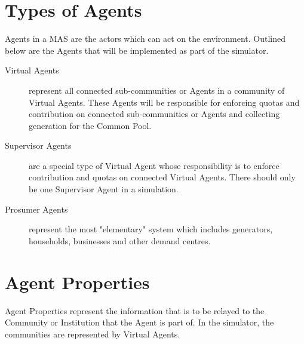 \section*{Types of Agents}
Agents in a MAS are the actors which can act on the environment. Outlined below are the Agents that will be implemented as part of the simulator.
\begin{description}

\item[Virtual Agents]
represent all connected sub-communities or Agents in a community of Virtual Agents. These Agents will be responsible for enforcing quotas and contribution on connected sub-communities or Agents and collecting generation for the Common Pool.

\item[Supervisor Agents] 
are a special type of Virtual Agent whose responsibility is to enforce contribution and quotas on connected Virtual Agents. There should only be one Supervisor Agent in a simulation.

\item[Prosumer Agents]
represent the most "elementary" system which includes generators, households, businesses and other demand centres.
\end{description}

\section*{Agent Properties}
Agent Properties represent the information that is to be relayed to the Community or Institution that the Agent is part of. In the simulator, the communities are represented by Virtual Agents.

